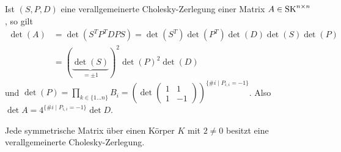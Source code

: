 \documentclass[../../main.tex]{subfiles}
\begin{document}
\begin{bem}\label{13.5.8}
Ist $(S,P,D)$ eine verallgemeinerte Cholesky-Zerlegung einer Matrix $A\in \operatorname{SK}^{n\times n}$, so gilt
\begin{align*}
\det(A)&=\det(S^TP^TDPS)=\det(S^T)\det(P^T)\det(D)\det(S)\det(P)\\
&=(\underbrace{\det(S)}_{=\pm 1})^2\det(P)^2\det(D)
\end{align*}
und $\det (P)=\prod_{k\in \{1...n\}} B_i=\left(\det\begin{pmatrix*}1&1\\ 1 &-1\end{pmatrix*}\right)^{\{\# i\mid P_{i,i}=-1\}}$. Also $\det A=4^{\{\# i\mid P_{i,i}=-1\}}\det D$.
\end{bem}

\begin{sat}\label{13.5.9} 
Jede symmetrische Matrix über einen Körper $K$ mit $2\neq 0$ besitzt eine verallgemeinerte Cholesky-Zerlegung.
\end{sat}
\end{document}
